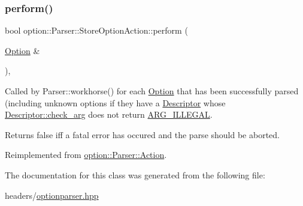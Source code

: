 \subsubsection{\texorpdfstring{perform()}{perform()}}
{\footnotesize\ttfamily bool option\+::\+Parser\+::\+Store\+Option\+Action\+::perform (\begin{DoxyParamCaption}\item[{\hyperlink{classoption_1_1Option}{Option} \&}]{ }\end{DoxyParamCaption})\hspace{0.3cm}{\ttfamily [inline]}, {\ttfamily [virtual]}}



Called by Parser\+::workhorse() for each \hyperlink{classoption_1_1Option}{Option} that has been successfully parsed (including unknown options if they have a \hyperlink{structoption_1_1Descriptor}{Descriptor} whose \hyperlink{structoption_1_1Descriptor_aa5d675dba0214a4abd73007ff163cc67}{Descriptor\+::check\+\_\+arg} does not return \hyperlink{namespaceoption_aee8c76a07877335762631491e7a5a1a9a9528e32563b795bd2930b12d0a5e382d}{A\+R\+G\+\_\+\+I\+L\+L\+E\+G\+AL}. 

Returns {\ttfamily false} iff a fatal error has occured and the parse should be aborted. 

Reimplemented from \hyperlink{structoption_1_1Parser_1_1Action_a176b5f783bb35eb015b6d2c09422457d}{option\+::\+Parser\+::\+Action}.



The documentation for this class was generated from the following file\+:\begin{DoxyCompactItemize}
\item 
headers/\hyperlink{optionparser_8hpp}{optionparser.\+hpp}\end{DoxyCompactItemize}
